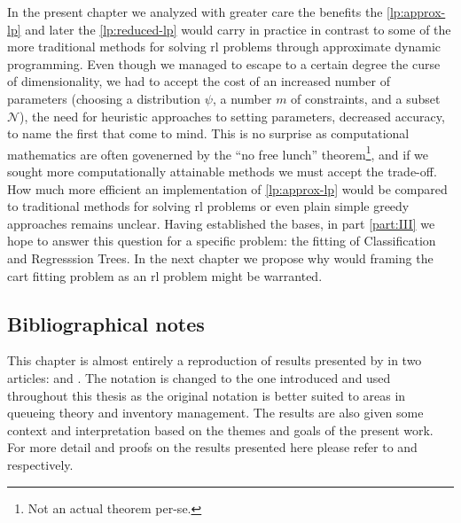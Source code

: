 In the present chapter we analyzed with greater care the benefits the
\eqref{lp:approx-lp} and later the \eqref{lp:reduced-lp} would carry in practice
in contrast to some of the more traditional methods for solving \acf{rl}
problems through approximate dynamic programming. Even though we managed to
escape to a certain degree the curse of dimensionality, we had to accept the
cost of an increased number of parameters (choosing a distribution $\psi$, a
number $m$ of constraints, and a subset $\mathcal{N}$), the need for heuristic
approaches to setting parameters, decreased accuracy, to name the first that
come to mind. This is no surprise as computational mathematics are often
govenerned by the ``no free lunch'' theorem\footnote{Not an actual theorem
per-se.}, and if we sought more computationally attainable methods we must
accept the trade-off. How much more efficient an implementation of
\eqref{lp:approx-lp} would be compared to traditional methods for solving
\ac{rl} problems or even plain simple greedy approaches remains unclear.  Having
established the bases, in part \ref{part:III} we hope to answer this question
for a specific problem: the fitting of Classification and Regresssion Trees. In
the next chapter we propose why would framing the \ac{cart} fitting problem as
an \ac{rl} problem might be warranted.

\subsection{Bibliographical notes}

This chapter is almost entirely a reproduction of results presented by
\citeauthor{farias2003LP2ADP} in two articles:  and
. The notation is changed to the one introduced
and used throughout this thesis as the original notation is better suited to
areas in queueing theory and inventory management. The results are also given
some context and interpretation based on the themes and goals of the present
work. For more detail and proofs on the results presented here please refer to
\cite{farias2003LP2ADP} and \cite{farias2004constraint} respectively.